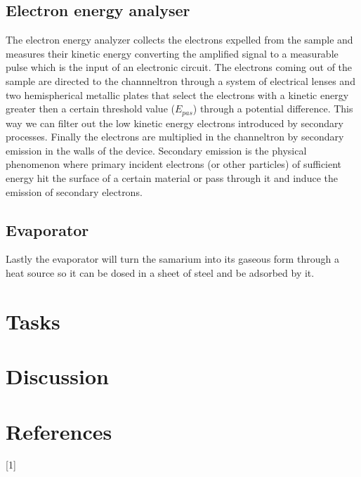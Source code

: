 \documentclass{article}
\begin{document}
\subsection{Electron energy analyser}
The electron energy analyzer collects the electrons expelled from the sample and measures their kinetic
energy converting the amplified signal to a measurable pulse which is the input of an electronic circuit. The electrons coming out of the sample are directed to the channneltron through a system of electrical lenses and two hemispherical metallic plates that select the electrons with a kinetic energy greater then a certain threshold value ($E_{pas}$) through a potential difference. This way we can filter out the low kinetic energy electrons introduced by secondary processes. Finally the electrons are multiplied in the channeltron by secondary emission in the walls of the device. Secondary emission is the physical phenomenon where primary incident electrons (or other particles) of sufficient energy hit the surface of a certain material or pass through it and induce the emission of secondary electrons.
\subsection{Evaporator}
Lastly the evaporator will turn the samarium into its gaseous form through a heat source so it can be dosed in a sheet of steel and be adsorbed by it.
\section{Tasks}
\section{Discussion}



\section*{References}

[1] 
\end{document}
